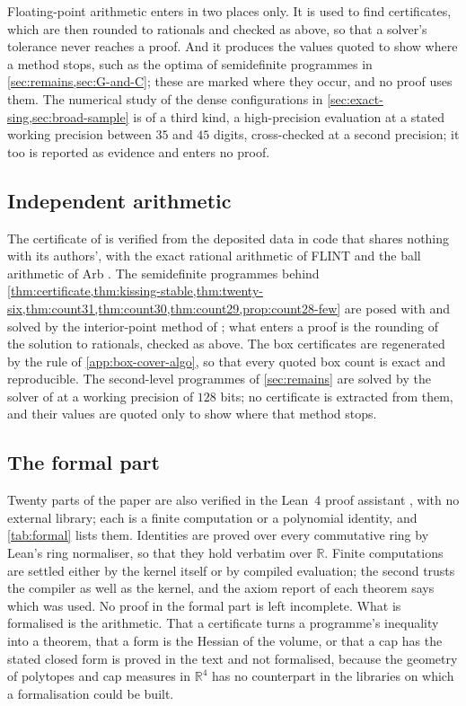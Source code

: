 \documentclass[11pt,reqno]{amsart}
\renewcommand{\_}{\origunderscore\allowbreak}
\numberwithin{equation}{section}
\theoremstyle{plain}
\theoremstyle{definition}
\theoremstyle{remark}
\begin{document}
Floating-point arithmetic enters in two places only. It is used to find
certificates, which are then rounded to rationals and checked as above, so
that a solver's tolerance never reaches a proof. And it produces the values
quoted to show where a method stops, such as the optima of semidefinite
programmes in \cref{sec:remains,sec:G-and-C}; these are marked where they
occur, and no proof uses them. The numerical study of the dense
configurations in \cref{sec:exact-sing,sec:broad-sample} is of a third
kind, a high-precision evaluation at a stated working precision between
$35$ and $45$ digits, cross-checked at a second precision; it too is
reported as evidence and enters no proof.

\subsection{Independent arithmetic}

The certificate of \cite{LLM24} is verified from the deposited data
\cite{LLM24data} in code that shares nothing with its authors', with the
exact rational arithmetic of FLINT and the ball arithmetic of Arb
\cite{Joh17}. The semidefinite programmes behind
\cref{thm:certificate,thm:kissing-stable,thm:twenty-six,thm:count31,thm:count30,thm:count29,prop:count28-few} are posed
with \cite{DB16} and solved by the interior-point method of \cite{GC26};
what enters a proof is the rounding of the solution to rationals, checked
as above. The box certificates are regenerated by the rule of
\cref{app:box-cover-algo}, so that every quoted box count is exact and
reproducible. The second-level programmes of \cref{sec:remains} are
solved by the solver of \cite{LdL24} at a working precision of $128$ bits;
no certificate is extracted from them, and their values are quoted only to
show where that method stops.

\subsection{The formal part}\label{sec:formal-part}

Twenty parts of the paper are also verified in the Lean~4 proof
assistant \cite{MU21}, with no external library; each is a finite
computation or a polynomial identity, and \cref{tab:formal} lists them.
Identities are proved over every commutative ring by Lean's ring
normaliser, so that they hold verbatim over $\mathbb{R}$. Finite
computations are settled either by the kernel itself or by compiled
evaluation; the second trusts the compiler as well as the kernel, and the
axiom report of each theorem says which was used. No proof in the formal
part is left incomplete. What is formalised is the arithmetic. That a
certificate turns a programme's inequality into a theorem, that a form is
the Hessian of the volume, or that a cap has the stated closed form is
proved in the text and not formalised, because the geometry of polytopes
and cap measures in $\mathbb{R}^4$ has no counterpart in the libraries on
which a formalisation could be built.
\end{document}

